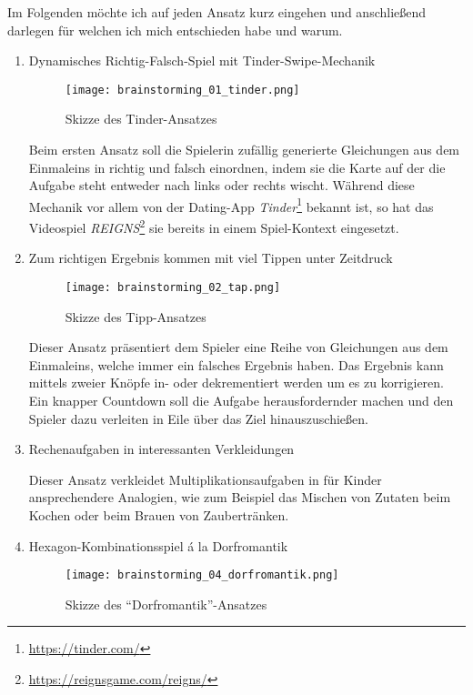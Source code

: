 Im Folgenden möchte ich auf jeden Ansatz kurz eingehen und anschließend darlegen für welchen ich mich entschieden habe und warum.

\begin{enumerate}
  \item Dynamisches Richtig-Falsch-Spiel mit Tinder-Swipe-Mechanik
  
  \begin{figure}[h]
    \centering
    \texttt{[image: brainstorming\_01\_tinder.png]}
    \caption{Skizze des Tinder-Ansatzes}
  \end{figure}

  Beim ersten Ansatz soll die Spielerin zufällig generierte Gleichungen aus dem Einmaleins in richtig und falsch einordnen, indem sie die Karte auf der die Aufgabe steht entweder nach links oder rechts wischt.
  Während diese Mechanik vor allem von der Dating-App \emph{Tinder}\footnote{\url{https://tinder.com/}} bekannt ist, so hat das Videospiel \emph{REIGNS}\footnote{\url{https://reignsgame.com/reigns/}} sie bereits in einem Spiel-Kontext eingesetzt.

  \item Zum richtigen Ergebnis kommen mit viel Tippen unter Zeitdruck
  
  \begin{figure}[h]
    \centering
    \texttt{[image: brainstorming\_02\_tap.png]}
    \caption{Skizze des Tipp-Ansatzes}
  \end{figure}

  Dieser Ansatz präsentiert dem Spieler eine Reihe von Gleichungen aus dem Einmaleins, welche immer ein falsches Ergebnis haben.
  Das Ergebnis kann mittels zweier Knöpfe in- oder dekrementiert werden um es zu korrigieren.
  Ein knapper Countdown soll die Aufgabe herausfordernder machen und den Spieler dazu verleiten in Eile über das Ziel hinauszuschießen.

  \item Rechenaufgaben in interessanten Verkleidungen
  
  Dieser Ansatz verkleidet Multiplikationsaufgaben in für Kinder ansprechendere Analogien, wie zum Beispiel das Mischen von Zutaten beim Kochen oder beim Brauen von Zaubertränken.

  \item Hexagon-Kombinationsspiel á la Dorfromantik
  
  \begin{figure}[h]
    \centering
    \texttt{[image: brainstorming\_04\_dorfromantik.png]}
    \caption{Skizze des \enquote{Dorfromantik}-Ansatzes}
  \end{figure}


\end{enumerate}

